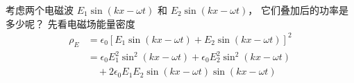
考虑两个电磁波 $E_1 \sin(k x - \omega t)$ 和 $E_2 \sin(kx - \omega t)$， 它们叠加后的功率是多少呢？ 先看电磁场能量密度
\begin{equation}
\begin{aligned}
\rho_E &= \epsilon_0 [E_1 \sin(k x - \omega t) + E_2 \sin(kx - \omega t)]^2\\
&= \epsilon_0 E_1^2 \sin^2(k x - \omega t) + \epsilon_0 E_2^2 \sin^2(kx - \omega t)\\
&\quad  + 2\epsilon_0 E_1 E_2 \sin(k x - \omega t) \sin(kx - \omega t)
\end{aligned}
\end{equation}
